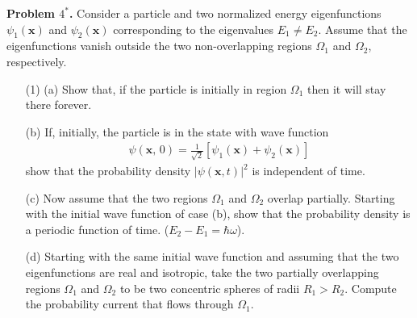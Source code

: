 \documentclass[floatfix,nofootinbib,superscriptaddress,fleqn]{revtex4-2}
\begin{document}
\noindent \textbf{Problem $4^*$.}
Consider a particle and two normalized energy eigenfunctions
$\psi_1(\bm{x})$ and $\psi_2(\bm{x})$ corresponding to the eigenvalues
$E_1\neq E_2$. Assume that the eigenfunctions vanish outside the two 
non-overlapping regions $\Omega_1$ and $\Omega_2$, respectively. 
\begin{itemize}
\item[(1)] (a) Show that, if the particle is initially in region
  $\Omega_1$ then it will stay there forever. 
\item[(b)] If, initially, the particle is in the state with wave function
\begin{align*}
  \psi(\bm{x},\,0) = \frac1{\sqrt{2}} [\psi_1(\bm{x}) +
  \psi_2(\bm{x})] 
\end{align*}
show that the probability density $|\psi(\bm{x},t)|^2$ is independent
of time. 
\item[(c)] Now assume that the two regions $\Omega_1$ and $\Omega_2$
  overlap partially. Starting with the initial wave function of case
  (b), show that the probability density is a periodic function of 
time. ($E_2-E_1=\hbar \omega$).
\item[(d)] Starting with the same initial wave function and assuming
  that the two eigenfunctions are real and isotropic, take the two
  partially overlapping regions $\Omega_1$ and $\Omega_2$ to be 
two concentric spheres of radii $R_1>R_2$. Compute the probability
current that flows through $\Omega_1$.
\end{itemize}
\end{document}
